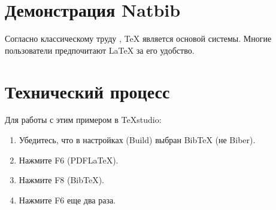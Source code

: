 \documentclass[a4paper, 12pt]{article}
\begin{document}
	
	\section{Демонстрация Natbib}
	
	Согласно классическому труду \citet{knuth1984}, TeX является основой системы. 
	Многие пользователи предпочитают LaTeX \citep{lamport1986} за его удобство.
	
	
	\section{Технический процесс}
	Для работы с этим примером в TeXstudio:
	\begin{enumerate}
		\item Убедитесь, что в настройках (Build) выбран BibTeX (не Biber).
		\item Нажмите F6 (PDFLaTeX).
		\item Нажмите F8 (BibTeX).
		\item Нажмите F6 еще два раза.
	\end{enumerate}
	
	
	
\end{document}
